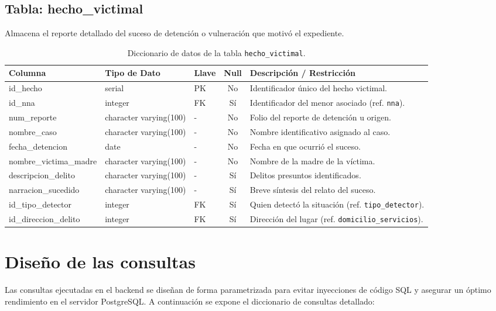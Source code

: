 \subsection{Tabla: hecho\_victimal}
Almacena el reporte detallado del suceso de detención o vulneración que motivó el expediente.
\begin{table}[htbp!]
\centering
\begin{tabular}{|l|l|l|c|l|}
\hline
\textbf{Columna} & \textbf{Tipo de Dato} & \textbf{Llave} & \textbf{Null} & \textbf{Descripción / Restricción} \\
\hline
id\_hecho & serial & PK & No & Identificador único del hecho victimal. \\
id\_nna & integer & FK & Sí & Identificador del menor asociado (ref. \texttt{nna}). \\
num\_reporte & character varying(100) & - & No & Folio del reporte de detención u origen. \\
nombre\_caso & character varying(100) & - & No & Nombre identificativo asignado al caso. \\
fecha\_detencion & date & - & No & Fecha en que ocurrió el suceso. \\
nombre\_victima\_madre & character varying(100) & - & No & Nombre de la madre de la víctima. \\
descripcion\_delito & character varying(100) & - & Sí & Delitos presuntos identificados. \\
narracion\_sucedido & character varying(100) & - & Sí & Breve síntesis del relato del suceso. \\
id\_tipo\_detector & integer & FK & Sí & Quien detectó la situación (ref. \texttt{tipo\_detector}). \\
id\_direccion\_delito & integer & FK & Sí & Dirección del lugar (ref. \texttt{domicilio\_servicios}). \\
\hline
\end{tabular}
\caption{Diccionario de datos de la tabla \texttt{hecho\_victimal}.}
\label{tbl:diccionarioHecho}
\end{table}

\section{Diseño de las consultas}
\label{sec:disenoConsultas}

Las consultas ejecutadas en el backend se diseñan de forma parametrizada para evitar inyecciones de código SQL y asegurar un óptimo rendimiento en el servidor PostgreSQL. A continuación se expone el diccionario de consultas detallado:

